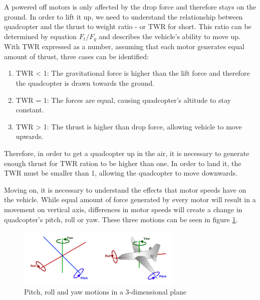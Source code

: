 A powered off motors is only affected by the drop force and therefore stays on the ground. In order to lift it up, we need to understand the relationship between quadcopter and the thrust to weight ratio - or TWR for short. This ratio can be determined by equation $F_t/F_g$ and describes the vehicle's ability to move up. With TWR expressed as a number, assuming that each motor generates equal amount of thrust, three cases can be identified:
\begin{enumerate}
\item TWR < 1: The gravitational force is higher than the lift force and therefore the quadcopter is drawn towards the ground.
\item TWR = 1: The forces are equal, causing quadcopter's altitude to stay constant.
\item TWR > 1: The thrust is higher than drop force, allowing vehicle to move upwards.
\end{enumerate}

Therefore, in order to get a quadcopter up in the air, it is necessary to generate enough thrust for TWR ration to be higher than one. In order to land it, the TWR must be smaller than 1, allowing the quadcopter to move downwards.

Moving on, it is necessary to understand the effects that motor speeds have on the vehicle. While equal amount of force generated by every motor will result in a movement on vertical axis, differences in motor speeds will create a change in quadcopter's pitch, roll or yaw. These three motions can be seen in figure \ref{droneMotions}.
\begin{figure}[H]
  \centering
    \includegraphics[width=0.7\textwidth]{images/droneMotions.png}
	\caption{Pitch, roll and yaw motions in a 3-dimensional plane\cite{dMotions}}
	\label{droneMotions}
\end{figure}

